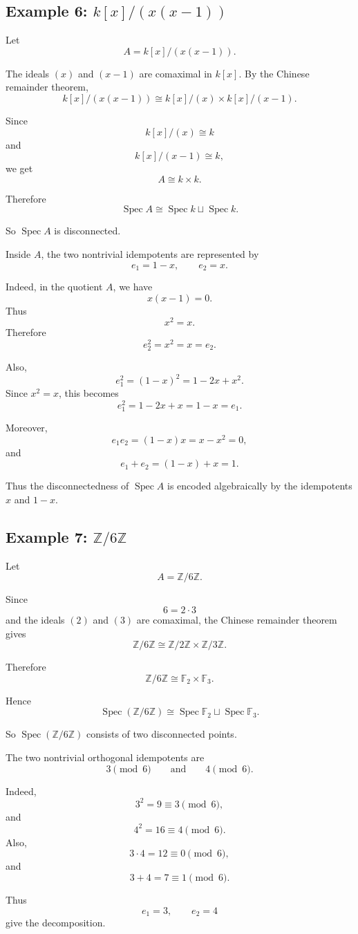 \documentclass[12pt,a4paper]{article}
\newcommand{\Z}{\mathbb{Z}}
\newcommand{\Spec}{\operatorname{Spec}}
\newcommand{\F}{\mathbb F}
\begin{document}
\subsection{Example 6: \(k[x]/(x(x-1))\)}

Let
\[
A=k[x]/(x(x-1)).
\]

The ideals \((x)\) and \((x-1)\) are comaximal in \(k[x]\). By the Chinese
remainder theorem,
\[
k[x]/(x(x-1))
\cong
k[x]/(x)\times k[x]/(x-1).
\]

Since
\[
k[x]/(x)\cong k
\]
and
\[
k[x]/(x-1)\cong k,
\]
we get
\[
A\cong k\times k.
\]

Therefore
\[
\Spec A
\cong
\Spec k\sqcup\Spec k.
\]

So \(\Spec A\) is disconnected.

Inside \(A\), the two nontrivial idempotents are represented by
\[
e_1=1-x,
\qquad
e_2=x.
\]

Indeed, in the quotient \(A\), we have
\[
x(x-1)=0.
\]
Thus
\[
x^2=x.
\]
Therefore
\[
e_2^2=x^2=x=e_2.
\]

Also,
\[
e_1^2=(1-x)^2=1-2x+x^2.
\]
Since \(x^2=x\), this becomes
\[
e_1^2=1-2x+x=1-x=e_1.
\]

Moreover,
\[
e_1e_2=(1-x)x=x-x^2=0,
\]
and
\[
e_1+e_2=(1-x)+x=1.
\]

Thus the disconnectedness of \(\Spec A\) is encoded algebraically by the
idempotents \(x\) and \(1-x\).

\subsection{Example 7: \(\Z/6\Z\)}

Let
\[
A=\Z/6\Z.
\]

Since
\[
6=2\cdot 3
\]
and the ideals \((2)\) and \((3)\) are comaximal, the Chinese remainder theorem
gives
\[
\Z/6\Z
\cong
\Z/2\Z\times \Z/3\Z.
\]

Therefore
\[
\Z/6\Z\cong \F_2\times \F_3.
\]

Hence
\[
\Spec(\Z/6\Z)
\cong
\Spec\F_2\sqcup\Spec\F_3.
\]

So \(\Spec(\Z/6\Z)\) consists of two disconnected points.

The two nontrivial orthogonal idempotents are
\[
3\pmod 6
\qquad\text{and}\qquad
4\pmod 6.
\]

Indeed,
\[
3^2=9\equiv 3\pmod 6,
\]
and
\[
4^2=16\equiv 4\pmod 6.
\]
Also,
\[
3\cdot 4=12\equiv 0\pmod 6,
\]
and
\[
3+4=7\equiv 1\pmod 6.
\]

Thus
\[
e_1=3,
\qquad
e_2=4
\]
give the decomposition.
\end{document}
